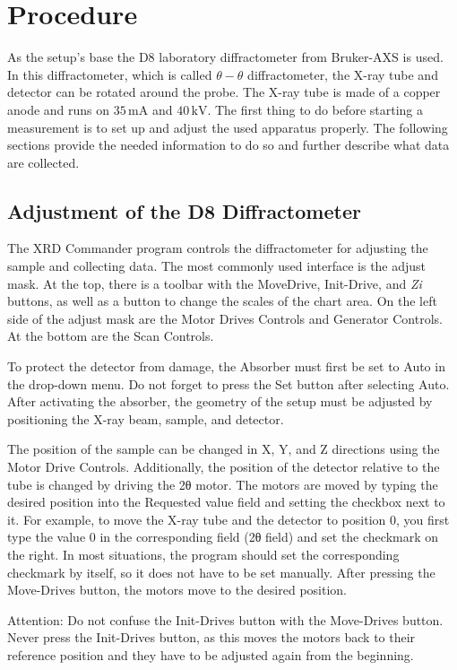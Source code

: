 \section{Procedure}

As the setup's base the D8 laboratory diffractometer from Bruker-AXS is used.
In this diffractometer, which is called $\theta - \theta$ diffractometer, the X-ray tube and detector can be rotated around the probe.
The X-ray tube is made of a copper anode and runs on $35\, \unit{\milli \ampere}$ and $40\, \unit{\kilo \volt}$.
The first thing to do before starting a measurement is to set up and adjust the used apparatus properly. 
The following sections provide the needed information to do so and further describe what data are collected.


\subsection{Adjustment of the D8 Diffractometer}
The XRD Commander program controls the diffractometer for adjusting the sample and collecting data. The most commonly used interface is the adjust mask. At the top, there is a toolbar with the MoveDrive, Init-Drive, and \textit{Zi} buttons, as well as a button to change the scales of the chart area. On the left side of the adjust mask are the Motor Drives Controls and Generator Controls. At the bottom are the Scan Controls.

To protect the detector from damage, the Absorber must first be set to Auto in the drop-down menu. Do not forget to press the Set button after selecting Auto. After activating the absorber, the geometry of the setup must be adjusted by positioning the X-ray beam, sample, and detector.

The position of the sample can be changed in X, Y, and Z directions using the Motor Drive Controls. Additionally, the position of the detector relative to the tube is changed by driving the 2θ motor. The motors are moved by typing the desired position into the Requested value field and setting the checkbox next to it. For example, to move the X-ray tube and the detector to position 0, you first type the value 0 in the corresponding field (2θ field) and set the checkmark on the right. In most situations, the program should set the corresponding checkmark by itself, so it does not have to be set manually. After pressing the Move-Drives button, the motors move to the desired position.

Attention: Do not confuse the Init-Drives button with the Move-Drives button. Never press the Init-Drives button, as this moves the motors back to their reference position and they have to be adjusted again from the beginning.

